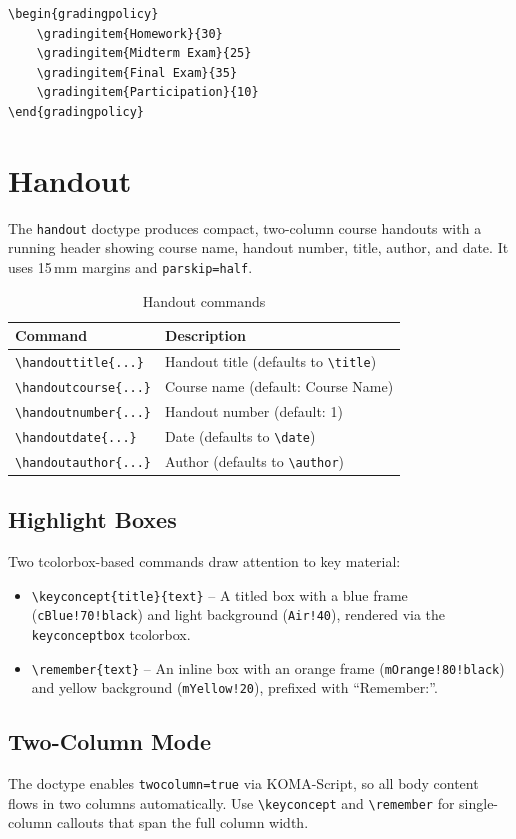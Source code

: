 \begin{verbatim}
\begin{gradingpolicy}
    \gradingitem{Homework}{30}
    \gradingitem{Midterm Exam}{25}
    \gradingitem{Final Exam}{35}
    \gradingitem{Participation}{10}
\end{gradingpolicy}
\end{verbatim}

\section{Handout}
\label{sec:handout}

The \texttt{handout} doctype produces compact, two-column course handouts
with a running header showing course name, handout number, title, author,
and date.  It uses 15\,mm margins and \texttt{parskip=half}.

\begin{table}[htbp]
    \centering
    \caption{Handout commands}
    \label{tab:handout-commands}
    \begin{tabular}{@{} l p{7.5cm} @{}}
        \toprule
        \textbf{Command} & \textbf{Description} \\
        \midrule
        \texttt{\textbackslash handouttitle\{...\}}  & Handout title (defaults to \texttt{\textbackslash title}) \\
        \texttt{\textbackslash handoutcourse\{...\}} & Course name (default: Course Name) \\
        \texttt{\textbackslash handoutnumber\{...\}} & Handout number (default: 1) \\
        \texttt{\textbackslash handoutdate\{...\}}   & Date (defaults to \texttt{\textbackslash date}) \\
        \texttt{\textbackslash handoutauthor\{...\}} & Author (defaults to \texttt{\textbackslash author}) \\
        \bottomrule
    \end{tabular}
\end{table}

\subsection{Highlight Boxes}

Two tcolorbox-based commands draw attention to key material:

\begin{itemize}
    \item \texttt{\textbackslash keyconcept\{title\}\{text\}} -- A titled
          box with a blue frame (\texttt{cBlue!70!black}) and light
          background (\texttt{Air!40}), rendered via the \texttt{keyconceptbox}
          tcolorbox.
    \item \texttt{\textbackslash remember\{text\}} -- An inline box with an
          orange frame (\texttt{mOrange!80!black}) and yellow background
          (\texttt{mYellow!20}), prefixed with ``Remember:''.
\end{itemize}

\subsection{Two-Column Mode}

The doctype enables \texttt{twocolumn=true} via KOMA-Script, so all body
content flows in two columns automatically.  Use
\texttt{\textbackslash keyconcept} and \texttt{\textbackslash remember}
for single-column callouts that span the full column width.
